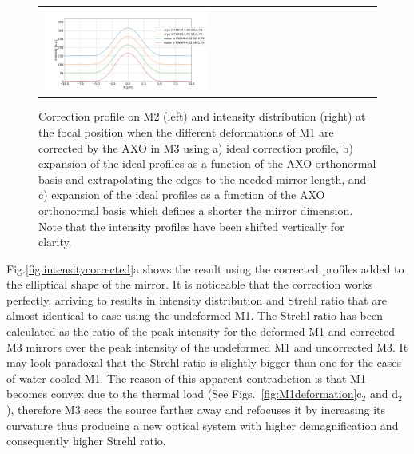\documentclass[preprint]{iucr}              %
\begin{document}
\begin{figure}
\begin{center}
\begin{tabular}{l}
   \includegraphics[width=0.5\textwidth]{figures/intensitycorrectedcropped.png}\\

   \end{tabular}
   \end{center}
   \caption
   { 
Correction profile on M2 (left) and intensity distribution (right) at the focal position when the different deformations of M1 are corrected by the AXO in M3 using  a) ideal correction profile, b)  expansion of the ideal profiles as a function of the AXO orthonormal basis and extrapolating the edges to the needed mirror length, and c)  expansion of the ideal profiles as a function of the AXO orthonormal basis which defines a shorter the mirror dimension. Note that the intensity profiles have been shifted vertically for clarity. }
   \end{figure} 



Fig.\ref{fig:intensitycorrected}a shows the result using the corrected profiles added to the elliptical shape of the mirror. It is noticeable that the correction works perfectly, arriving to results in intensity distribution and Strehl ratio that are almost identical to case using the undeformed M1. The Strehl ratio has been calculated as the ratio of the peak intensity for the deformed M1 and corrected M3 mirrors over the peak intensity of the undeformed M1 and uncorrected M3. It may look paradoxal that the Strehl ratio is slightly bigger than one for the cases of water-cooled M1. The reason of this apparent contradiction is that M1 becomes convex due to the thermal load (See Figs.~\ref{fig:M1deformation}c$_2$ and d$_2$), therefore M3 sees the source farther away and refocuses it by increasing its curvature thus producing a new optical system with higher demagnification and consequently higher Strehl ratio.   
\end{document}
